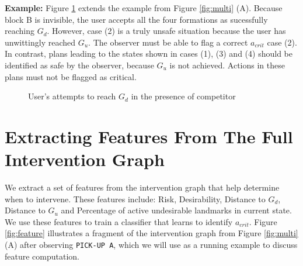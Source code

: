 \documentclass[letterpaper]{article}
\theoremstyle{plain}
\begin{document}
\textbf{Example:} Figure \ref{fig:fails} extends the example from Figure \ref{fig:multi} (A). Because block B is invisible, the user accepts all the four formations as sucessfully reaching $G_d$. However, case (2) is a truly unsafe situation because the user has unwittingly reached $G_u$. The observer must be able to flag a correct $a_{crit}$ case (2). In contrast, plans leading to the states shown in cases (1), (3) and (4) should be identified as safe by the observer, because $G_u$ is not achieved. Actions in these plans must not be flagged as critical.
\begin{figure}[ht]
        \caption{User's attempts to reach $G_d$ in the presence of competitor}
        \label{fig:fails}
\end{figure}


\section{Extracting Features From The Full Intervention Graph}
We extract a set of features from the intervention graph that help determine when to intervene. These features include: Risk, Desirability, Distance to $G_d$, Distance to $G_u$ and Percentage of active undesirable landmarks in current state. We use these features to train a classifier that learns to identify $a_{crit}$. Figure \ref{fig:feature} illustrates a fragment of the intervention graph from Figure \ref{fig:multi} (A) after observing \texttt{PICK-UP A}, which we will use as a running example to discuss feature computation.
\end{document}
